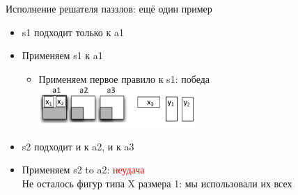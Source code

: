\documentclass[aspectratio=169
  , xcolor={svgnames}
  , hyperref={ colorlinks,citecolor=DeepPink4
             , linkcolor=DarkRed,urlcolor=DarkBlue}
  , russian
  ]{beamer}
\theoremstyle{exerciseStyle1}
\begin{document}
\begin{frame}[fragile]{Исполнение решателя паззлов: ещё один пример}
\begin{minipage}{.53\textwidth}
\begin{itemize}
\item  s1 подходит только к a1 
\item Применяем s1 к a1 
  \begin{itemize}
  \item  Применяем первое правило к s1: победа
    \includegraphics[width=6cm]{figures/puz-example8}
  \end{itemize}
\item s2 подходит и к a2, и к a3
\item Применяем s2 to a2: \textcolor{red}{неудача}\\
Не осталось фигур типа X размера 1: мы использовали их всех
\end{itemize}
\end{minipage}
\end{frame}
\end{document}
